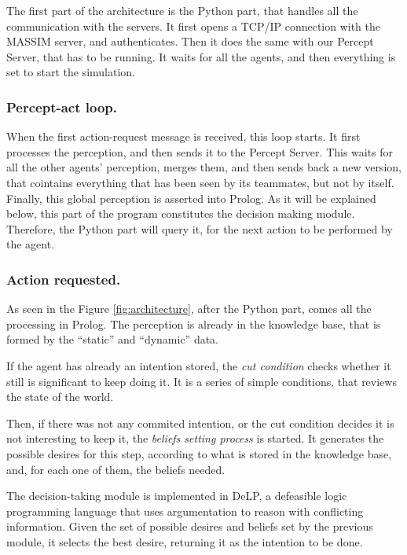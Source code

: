 \documentclass{llncs2e/llncs}
\begin{document}
    The first part of the architecture is the Python part, that handles all the 
    communication with the servers. It first opens a TCP/IP connection with the 
    MASSIM server, and authenticates. Then it does the same with our Percept 
    Server, that has to be running. It waits for all the agents, and then 
    everything is set to start the simulation.

\subsubsection{Percept-act loop.}

    When the first action-request message is received, this loop starts. It 
    first processes the perception, and then sends it to the Percept Server. 
    This waits for all the other agents' perception, merges them, and then sends 
    back a new version, that cointains everything that has been seen by its
    teammates, but not by itself. Finally, this global perception is asserted 
    into Prolog. 
    As it will be explained below, this part of the program constitutes the 
    decision making module. Therefore, the Python part will query it, for the
    next action to be performed by the agent.
    
\subsubsection{Action requested.}

    As seen in the Figure \ref{fig:architecture}, after the Python part, comes 
    all the processing in Prolog. The perception is already in the knowledge 
    base, that is formed by the ``static'' and ``dynamic'' data. 

    If the agent has already an intention stored, the \textit{cut condition} 
    checks whether it still is significant to keep doing it. It is a series of 
    simple conditions, that reviews the state of the world.

    Then, if there was not any commited intention, or the cut condition decides it is not 
    interesting to keep it, the \textit{beliefs setting process} is started. It 
    generates the possible desires for this step, according to what is stored in 
    the knowledge base, and, for each one of them, the beliefs needed.

    The decision-taking module is implemented in DeLP, a defeasible logic 
    programming language that uses argumentation to reason with conflicting
    information. 
    Given the set of possible 
    desires and beliefs set by the previous module, it selects the best desire, 
    returning it as the intention to be done.
\end{document}
